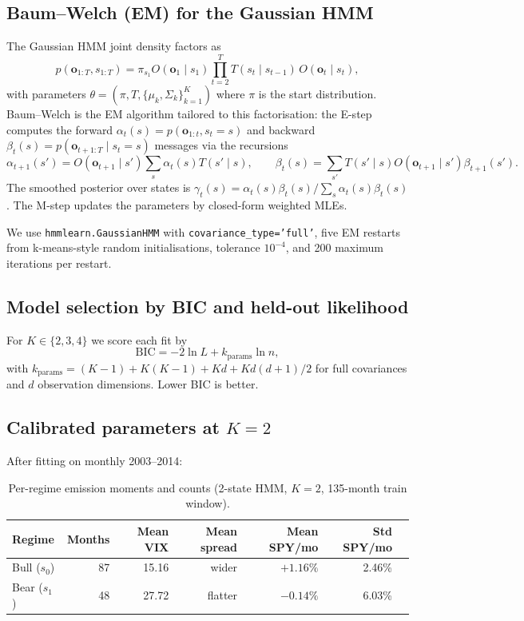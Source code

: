 \documentclass[11pt]{article}
\theoremstyle{plain1}
\theoremstyle{definition1}
\newcommand{\1}{\mathbf{1}}
\begin{document}
\subsection{Baum--Welch (EM) for the Gaussian HMM}

The Gaussian HMM joint density factors as
\[
p(\mathbf{o}_{1:T}, s_{1:T}) = \pi_{s_1} O(\mathbf{o}_1 \mid s_1) \prod_{t=2}^T T(s_t \mid s_{t-1})\, O(\mathbf{o}_t \mid s_t),
\]
with parameters $\theta = (\pi, T, \{\mu_k, \Sigma_k\}_{k=1}^K)$ where $\pi$ is the start distribution. Baum--Welch is the EM algorithm tailored to this factorisation: the E-step computes the forward $\alpha_t(s) = p(\mathbf{o}_{1:t}, s_t{=}s)$ and backward $\beta_t(s) = p(\mathbf{o}_{t+1:T} \mid s_t{=}s)$ messages via the recursions
\[
\alpha_{t+1}(s') = O(\mathbf{o}_{t+1} \mid s') \sum_s \alpha_t(s) T(s' \mid s), \qquad
\beta_t(s) = \sum_{s'} T(s' \mid s) O(\mathbf{o}_{t+1} \mid s') \beta_{t+1}(s').
\]
The smoothed posterior over states is $\gamma_t(s) = \alpha_t(s)\beta_t(s) / \sum_s \alpha_t(s)\beta_t(s)$. The M-step updates the parameters by closed-form weighted MLEs.

We use \texttt{hmmlearn.GaussianHMM} with \texttt{covariance\_type='full'}, five EM restarts from k-means-style random initialisations, tolerance $10^{-4}$, and 200 maximum iterations per restart.

\subsection{Model selection by BIC and held-out likelihood}

For $K \in \{2, 3, 4\}$ we score each fit by
\[
\text{BIC} = -2 \ln L + k_{\text{params}} \ln n,
\]
with $k_{\text{params}} = (K-1) + K(K-1) + Kd + Kd(d+1)/2$ for full covariances and $d$ observation dimensions. Lower BIC is better.

\subsection{Calibrated parameters at $K{=}2$}

After fitting on monthly 2003--2014:

\begin{table}[H]\centering
\caption{Per-regime emission moments and counts (2-state HMM, $K=2$, 135-month train window).}\label{tab:hmm-params}
\small
\begin{tabular}{lrrrrrr}
\toprule
Regime & Months & Mean VIX & Mean spread & Mean SPY/mo & Std SPY/mo \\
\midrule
Bull ($s_0$) & 87 & 15.16 & wider & $+1.16\%$ & 2.46\% \\
Bear ($s_1$) & 48 & 27.72 & flatter & $-0.14\%$ & 6.03\% \\
\bottomrule
\end{tabular}
\end{table}
\end{document}

